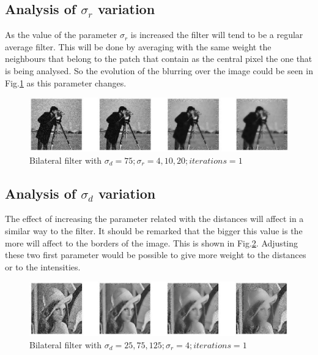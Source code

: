 \documentclass[a4paper, 10pt, conference] {article}
\begin{document}
\subsection{Analysis of $\sigma_{r}$ variation}
As the value of the parameter $\sigma_{r}$ is increased the filter will tend to be a regular average filter. This will be done by averaging with the same weight the neighbours that belong to the patch that contain as the central pixel the one that is being analysed. So the evolution of the blurring over the image could be seen in Fig.\ref{r} as this parameter changes.
\begin{figure}[H]
	\centering
	\includegraphics[width=1\textwidth]{sigmaR_analysis.JPG} %
	\caption{Bilateral filter with $\sigma_{d}=75; \sigma_{r}=4, 10, 20; iterations = 1$}
	\label{r}
\end{figure}


\subsection{Analysis of $\sigma_{d}$ variation}
The effect of increasing the parameter related with the distances will affect in a similar way to the filter. It should be remarked that the bigger this value is the more will affect to the borders of the image. This is shown in Fig.\ref{d}. Adjusting these two first parameter would be possible to give more weight to the distances or to the intensities.
\begin{figure}[H]
	\centering
	\includegraphics[width=1\textwidth]{sigmaD_analysis.JPG} %
	\caption{Bilateral filter with $\sigma_{d}=25, 75, 125; \sigma_{r}=4; iterations = 1$}
	\label{d}
\end{figure}
\end{document}
